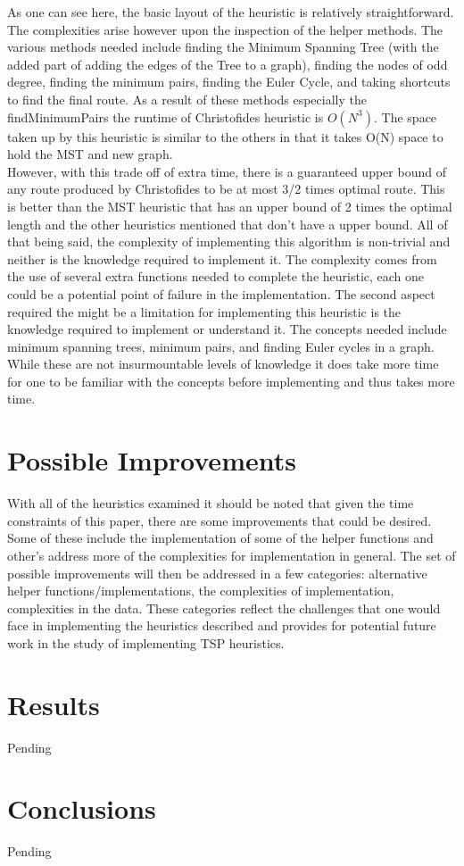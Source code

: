 \documentclass[midd]{thesis}
\newcommand{\tab}{\hspace*{2em}}
\begin{document}
\tab As one can see here, the basic layout of the heuristic is relatively straightforward. The complexities arise however upon the inspection of the helper methods. The various methods needed include finding the Minimum Spanning Tree (with the added part of adding the edges of the Tree to a graph), finding the nodes of odd degree, finding the minimum pairs, finding the Euler Cycle, and taking shortcuts to find the final route. As a result of these methods especially the findMinimumPairs the runtime of Christofides heuristic is $O(N^3)$. The space taken up by this heuristic is similar to the others in that it takes O(N) space to hold the MST and new graph. \\
\tab However, with this trade off of extra time, there is a guaranteed upper bound of any route produced by Christofides to be at most 3/2 times optimal route. This is better than the MST heuristic that has an upper bound of 2 times the optimal length and the other heuristics mentioned that don't have a upper bound. All of that being said, the complexity of implementing this algorithm is non-trivial and neither is the knowledge required to implement it. The complexity comes from the use of several extra functions needed to  complete the heuristic, each one could be a potential point of failure in the implementation. The second aspect required the might be a limitation for implementing this heuristic is the knowledge required to implement or understand it. The concepts needed include minimum spanning trees, minimum pairs, and finding Euler cycles in a graph. While these are not insurmountable levels of knowledge it does take more time for one to be familiar with the concepts before implementing and thus takes more time.\\ 

\chapter{Possible Improvements}
\tab With all of the heuristics examined it should be noted that given the time constraints of this paper, there are some improvements that could be desired. Some of these include the implementation of some of the helper functions and other's address more of the complexities for implementation in general. The set of possible improvements will then be addressed in a few categories:  alternative helper functions/implementations, the complexities of implementation, complexities in the data. These categories reflect the challenges that one would face in implementing the heuristics described and provides for potential future work in the study of implementing TSP heuristics.\\


\chapter{Results}
Pending\\
\chapter{Conclusions}
Pending\\

\end{document}
